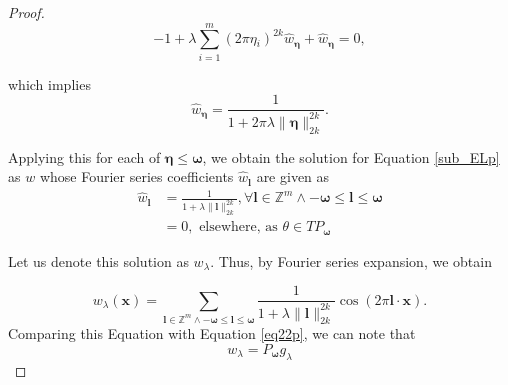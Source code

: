 \documentclass[multixcb]{amstext-l}
\theoremstyle{plain}
\theoremstyle{definition}
\theoremstyle{definition}
\theoremstyle{remark}
\numberwithin{equation}{chapter}
\begin{document}
\begin{appendix}
\begin{proof}
\begin{equation}\label{eq19p}
    -1 + \lambda\sum\limits_{i = 1}^m (2\pi \eta{_i})^{2k}\hat{w}_{\boldsymbol{\eta}} + \hat{w}_{\boldsymbol{\eta}} = 0, 
\end{equation}

which implies 
\begin{equation}\label{eq20p}
    \hat{w}_{\boldsymbol{\eta}} = \frac{1}{1+2\pi\lambda\|\boldsymbol{\eta}\|_{2k}^{2k}}.  
\end{equation}

Applying this for each of $\boldsymbol{\eta} \le \boldsymbol{\omega}$, we obtain the solution for Equation \ref{sub_ELp} as $w$ whose Fourier series coefficients $\hat{w}_{\boldsymbol{l}}$ are given as \begin{equation}\label{eq21p}\begin{aligned}
    \hat{w}_{\boldsymbol{l}} &=  \frac{1}{1+\lambda\|\boldsymbol{l}\|_{2k}^{2k}}, \forall \boldsymbol{l}\in\mathbb{Z}^m\land-\boldsymbol{\omega}\le\boldsymbol{l}\le\boldsymbol{\omega}\\%
    &= 0, \mbox{ elsewhere, as } \theta\in TP_{\boldsymbol{\omega}}
    \end{aligned}
\end{equation} 

Let us denote this solution as $w_{\lambda}$. Thus, by Fourier series expansion, we obtain 

\begin{equation}\label{eq22p}
    w_{\lambda}(\boldsymbol{x}) =  \sum_{\boldsymbol{l}\in\mathbb{Z}^m \land -\boldsymbol{\omega} \le \boldsymbol{l}\le \boldsymbol{\omega} } \frac{1}{1+\lambda\|\boldsymbol{l}\|_{2k}^{2k}} \cos{(2\pi\boldsymbol{l}\cdot\boldsymbol{x})}.
\end{equation}
Comparing this Equation with Equation \ref{eq22p}, we can note that \begin{equation}
    w_{\lambda} = P_{\boldsymbol{\omega}}g_{\lambda}
\end{equation}


\end{proof}
\end{appendix}
\end{document}
